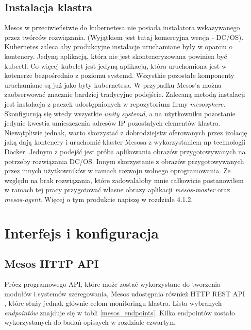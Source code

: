 \documentclass[10pt,a4paper,titlepage,twoside]{report}
\begin{document}
\subsection{Instalacja klastra}
Mesos \cite{ad33} \cite{ad34} w przeciwieństwie do kubernetesa nie posiada instalatora wskazywanego przez twórców rozwiązania. (Wyjątkiem jest tutaj komercyjna wersja - DC/OS). Kubernetes zaleca aby produkcyjne instalacje uruchamiane były w oparciu o kontenery. Jedyną aplikacją, która nie jest skonteneryzowana powinien być kubectl. Co więcej kubelet jest jedyną aplikacją, która uruchomiona jest w kotenerze bezpośrednio z poziomu systemd. Wszystkie pozostałe komponenty uruchamiane są już jako byty kubernetesa. W przypadku Mesos'a można zaobserwować znacznie bardziej tradycyjne podejście. Zalecaną metodą instalacji jest instalacja z paczek udostępnionych w repozytorium firmy \textit{mesosphere}. Skonfigurują się wtedy wszystkie \textit{unity systemd}, a na użytkowniku pozostanie jedynie kwestia umieszczenia adresów IP pozostałych elementów klastra. Niewątpliwie jednak, warto skorzystać z dobrodziejstw oferowanych przez izolację jaką dają kontenery i uruchomić klaster Mesosa z wykorzystaniem np technologii Docker. Jednym z podejść jest próba aplikowania obrazów przygotowywanych na potrzeby rozwiązania DC/OS. Innym skorzystanie z obrazów przygotowywanych przez innych użytkowników w ramach rozwoju wolnego oprogramowania. Ze względu na brak rozwiązania, które zadowalałoby mnie całkowicie postanowiłem w ramach tej pracy przygotować własne obrazy aplikacji \textit{mesos-master} oraz \textit{mesos-agent}. Więcej o tym produkcie napiszę w rozdziale 4.1.2.

\section{Interfejs i konfiguracja}
\subsection{Mesos HTTP API}
Prócz programowego API, które może zostać wykorzystane do tworzenia modułów i systemów szeregowania, Mesos udostępnia również HTTP REST API \cite{ad38}, które służy jednak głównie celom monitoringu klastra. Lista wybranych \textit{endpointów} znajduje się w tabli \ref{mesos_endpoints}.  Kilka endpointów zostało wykorzystanych do badań opisaych w rozdziale czwartym. 
\end{document}

